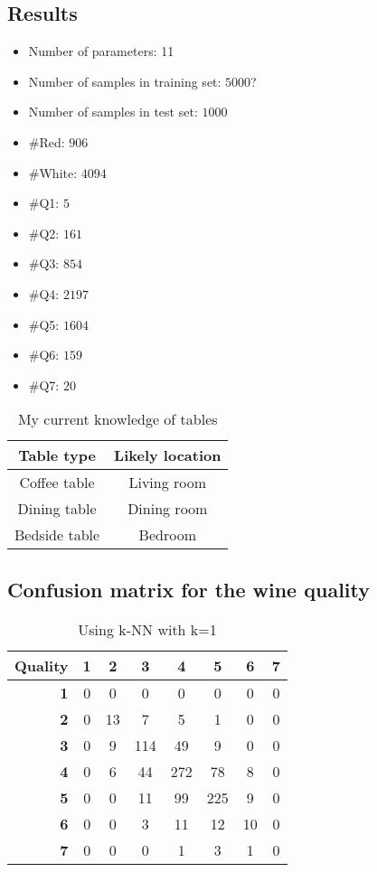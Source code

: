 \documentclass[twoside]{article}
\begin{document}
\begin{multicols}{2}

\section{Results}

\begin{itemize}
  \item Number of parameters: 11
  \item Number of samples in training set: $5000$?
  \item Number of samples in test set: $1000$
  \item \#Red: $906$
  \item \#White: $4094$
  \item \#Q1: $5$
  \item \#Q2: $161$
  \item \#Q3: $854$
  \item \#Q4: $2197$
  \item \#Q5: $1604$
  \item \#Q6: $159$
  \item \#Q7: $20$
\end{itemize}



\begin{table}[H]
\caption{My current knowledge of tables}
\centering
\begin{tabular}{cc}
\textbf{Table type} & \textbf{Likely location}\\
\midrule
Coffee table & Living room\\
Dining table & Dining room\\
Bedside table & Bedroom
\end{tabular}
\end{table}

\subsection{Confusion matrix for the wine quality}

\begin{table}[H]
\caption{Using k-NN with k=1}
\centering
\begin{tabular}{r||c|c|c|c|c|c|c}
\textbf{Quality} & \textbf{1} & \textbf{2} & \textbf{3} & \textbf{4} & \textbf{5} & \textbf{6} & \textbf{7}\\
\hline \hline
\textbf{1} & 0 & 0 & 0 & 0 & 0 & 0 & 0	\\
\hline
\textbf{2} & 0 & 13 & 7 & 5 & 1 & 0 & 0\\
\hline
\textbf{3} & 0 & 9 & 114 & 49 & 9 & 0 & 0\\
\hline
\textbf{4} & 0 & 6 & 44 & 272 & 78 & 8 & 0\\
\hline
\textbf{5} & 0 & 0 & 11 & 99 & 225 & 9 & 0\\
\hline
\textbf{6} & 0 & 0 & 3 & 11 & 12 & 10 & 0\\
\hline
\textbf{7} & 0 & 0 & 0 & 1 & 3 & 1 & 0\\
\end{tabular}
\end{table}





\end{multicols}
\end{document}
